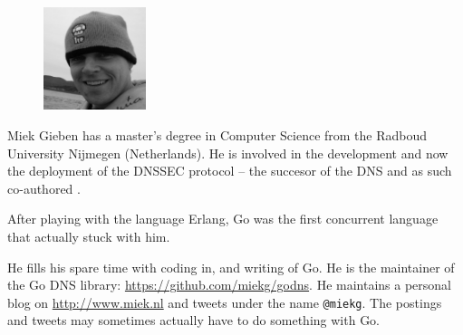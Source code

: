 \begin{figure}
  \begin{center}
  \includegraphics[width=3cm]{fig/avatar-miekg-300x300}
  \end{center}
\end{figure}
Miek Gieben has a master's degree in Computer Science from the Radboud University Nijmegen (Netherlands).
He is involved in the development and now the deployment of the DNSSEC protocol \cite{RFC4033,RFC4034,RFC4035} --
the succesor of the DNS and as such co-authored \cite{RFC4641}.

After playing with the language Erlang, Go was the first concurrent language
that actually stuck with him.

He fills his spare time with coding in, and writing of Go. He is the maintainer
of the Go DNS library: \url{https://github.com/miekg/godns}.
He maintains a personal blog on \url{http://www.miek.nl} and tweets
under the name \texttt{@miekg}. The postings and tweets may sometimes 
actually have to do something with Go.

